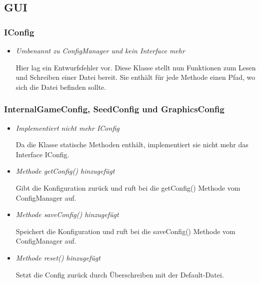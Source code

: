 \subsection{GUI}

\subsubsection{IConfig}
\begin{itemize}
    \item \textit{Umbenannt zu ConfigManager und kein Interface mehr}
        \begin{leftbar}[0.9\linewidth]
            Hier lag ein Entwurfsfehler vor. Diese Klasse stellt nun Funktionen zum Lesen und 
            Schreiben einer Datei bereit. Sie enthält für jede Methode einen Pfad, wo sich 
            die Datei befinden sollte.
        \end{leftbar}
\end{itemize}

\subsubsection{InternalGameConfig, SeedConfig und GraphicsConfig}
\begin{itemize}
    \item \textit{Implementiert nicht mehr IConfig}
        \begin{leftbar}[0.9\linewidth]
            Da die Klasse statische Methoden enthält, implementiert sie nicht mehr das 
            Interface IConfig.
        \end{leftbar}
    \item \textit{Methode getConfig() hinzugefügt}
        \begin{leftbar}[0.9\linewidth]
            Gibt die Konfiguration zurück und ruft bei die getConfig()
            Methode vom ConfigManager auf.
        \end{leftbar}
    \item \textit{Methode saveConfig() hinzugefügt}
        \begin{leftbar}[0.9\linewidth]
            Speichert die Konfiguration und ruft bei die 
            saveConfig() Methode vom ConfigManager auf.
        \end{leftbar}
    \item \textit{Methode reset() hinzugefügt}
        \begin{leftbar}[0.9\linewidth]
            Setzt die Config zurück durch Überschreiben mit der Default-Datei.
        \end{leftbar}
\end{itemize}


